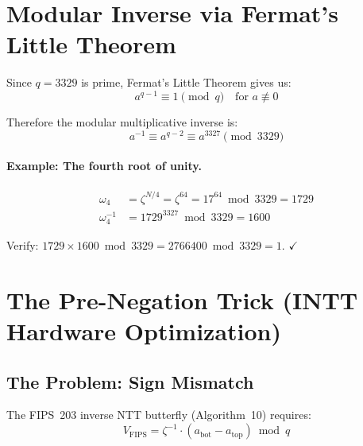\documentclass[11pt,a4paper]{article}
\begin{document}
\section{Modular Inverse via Fermat's Little Theorem}
\label{sec:fermat}

Since $q = 3329$ is prime, Fermat's Little Theorem gives us:
\begin{equation}
  a^{q-1} \equiv 1 \pmod{q} \quad \text{for } a \not\equiv 0
\end{equation}

Therefore the modular multiplicative inverse is:
\begin{equation}
  \boxed{a^{-1} \equiv a^{q-2} \equiv a^{3327} \pmod{3329}}
  \label{eq:fermat-inv}
\end{equation}

\paragraph{Example: The fourth root of unity.}
\begin{align*}
  \omega_4 &= \zeta^{N/4} = \zeta^{64} = 17^{64} \bmod 3329 = 1729 \\
  \omega_4^{-1} &= 1729^{3327} \bmod 3329 = 1600
\end{align*}

Verify: $1729 \times 1600 \bmod 3329 = 2766400 \bmod 3329 = 1$. $\checkmark$

\section{The Pre-Negation Trick (INTT Hardware Optimization)}
\label{sec:pre-negate}

\subsection{The Problem: Sign Mismatch}

The FIPS~203 inverse NTT butterfly (Algorithm~10) requires:
\begin{equation}
  V_{\text{FIPS}} = \zeta^{-1} \cdot (a_{\text{bot}} - a_{\text{top}}) \bmod q
  \label{eq:fips-butterfly}
\end{equation}
\end{document}
